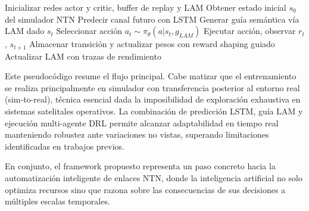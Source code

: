 \begin{algorithm}[h]
\caption{Entrenamiento del Framework LAM-DRL para NTN}
\label{alg:entrenamiento}
\begin{algorithmic}[1]
\State Inicializar redes actor y critic, buffer de replay y LAM
    \State Obtener estado inicial $s_0$ del simulador NTN
        \State Predecir canal futuro con LSTM
        \State Generar guía semántica vía LAM dado $s_t$
        \State Seleccionar acción $a_t \sim \pi_{\theta}(a|s_t, g_{LAM})$
        \State Ejecutar acción, observar $r_t$, $s_{t+1}$
        \State Almacenar transición y actualizar pesos con reward shaping guiado
    \EndFor
    \State Actualizar LAM con trazas de rendimiento
\EndFor
\end{algorithmic}
\end{algorithm}

Este pseudocódigo resume el flujo principal. Cabe matizar que el entrenamiento se realiza principalmente en simulador con transferencia posterior al entorno real (sim-to-real), técnica esencial dada la imposibilidad de exploración exhaustiva en sistemas satelitales operativos. La combinación de predicción LSTM, guía LAM y ejecución multi-agente DRL permite alcanzar adaptabilidad en tiempo real manteniendo robustez ante variaciones no vistas, superando limitaciones identificadas en trabajos previos.

En conjunto, el framework propuesto representa un paso concreto hacia la automatización inteligente de enlaces NTN, donde la inteligencia artificial no solo optimiza recursos sino que razona sobre las consecuencias de sus decisiones a múltiples escalas temporales.